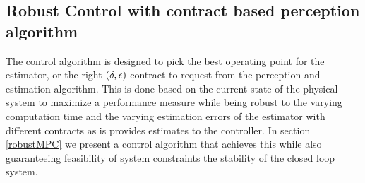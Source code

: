 \subsection{Robust Control with contract based perception algorithm}

The control algorithm is designed to pick the best operating point for the estimator, or the right $(\delta,\epsilon)$ contract to request from the perception and estimation algorithm. This is done based on the current state of the physical system to maximize a performance measure while being robust to the varying computation time and the varying estimation errors of the estimator with different contracts as is provides estimates to the controller. In section \ref{robustMPC} we present a control algorithm that achieves this while also guaranteeing feasibility of system constraints the stability of the closed loop system.






